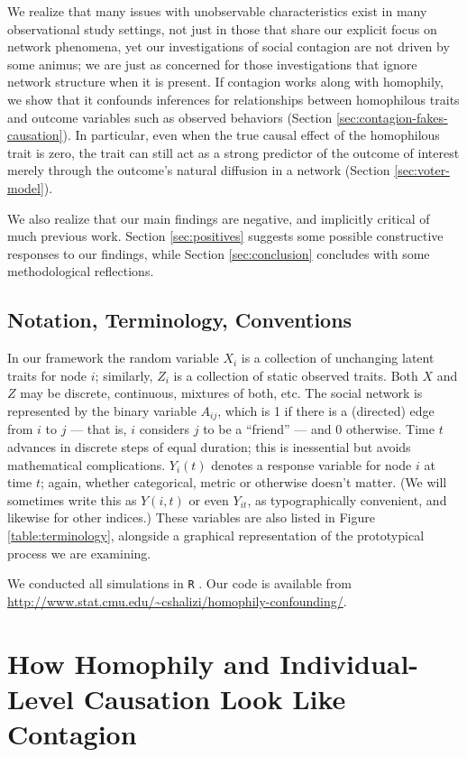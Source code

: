 \documentclass{article}
\begin{document}
\begin{multicols}{2}
We realize that many issues with unobservable characteristics exist in many
observational study settings, not just in those that share our explicit focus
on network phenomena, yet our investigations of social contagion are not driven
by some animus; we are just as concerned for those investigations that ignore
network structure when it is present.  If contagion works along with homophily,
we show that it confounds inferences for relationships between homophilous
traits and outcome variables such as observed behaviors (Section
\ref{sec:contagion-fakes-causation}).  In particular, even when the true causal
effect of the homophilous trait is zero, the trait can still act as a strong
predictor of the outcome of interest merely through the outcome's natural
diffusion in a network (Section \ref{sec:voter-model}).

We also realize that our main findings are negative, and implicitly critical of
much previous work.  Section \ref{sec:positives} suggests some possible
constructive responses to our findings, while Section \ref{sec:conclusion}
concludes with some methodological reflections.


\subsection{Notation, Terminology, Conventions}

In our framework the random variable $X_i$ is a collection of unchanging latent
traits for node $i$; similarly, $Z_i$ is a collection of static observed
traits.  Both $X$ and $Z$ may be discrete, continuous, mixtures of both, etc.
The social network is represented by the binary variable $A_{ij}$, which is 1
if there is a (directed) edge from $i$ to $j$ --- that is, $i$ considers $j$ to
be a ``friend'' --- and 0 otherwise.  Time $t$ advances in discrete steps of
equal duration; this is inessential but avoids mathematical complications.
$Y_i(t)$ denotes a response variable for node $i$ at time $t$; again, whether
categorical, metric or otherwise doesn't matter.  (We will sometimes write this
as $Y(i,t)$ or even $Y_{it}$, as typographically convenient, and likewise for
other indices.)  These variables are also listed in Figure
\ref{table:terminology}, alongside a graphical representation of the
prototypical process we are examining.

We conducted all simulations in \texttt{R} \citep{R}.  Our code is available
from \url{http://www.stat.cmu.edu/~cshalizi/homophily-confounding/}.

\section{How Homophily and Individual-Level Causation Look Like
  Contagion} 
\label{sec:homophily-fakes-contagion}


\end{multicols}
\end{document}
